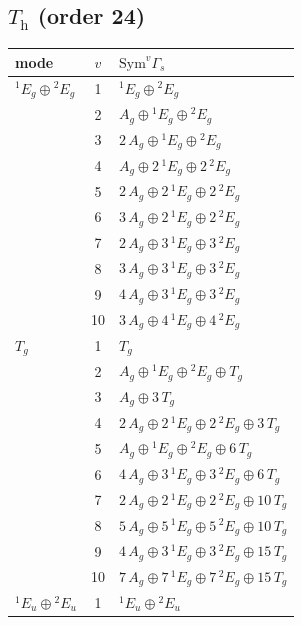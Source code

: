 \documentclass[11pt]{article}
\begin{document}
\subsection*{$T_{\mathrm h}$ \quad (order 24)}
\begin{longtable}{l c p{}}
\hline mode & $v$ & $\mathrm{Sym}^v\Gamma_s$\\ \hline\endhead
${}^{1}E_{g}\oplus {}^{2}E_{g}$ & 1 & ${}^{1}E_{g}\oplus {}^{2}E_{g}$\\
 & 2 & $A_{g}\oplus {}^{1}E_{g}\oplus {}^{2}E_{g}$\\
 & 3 & $2\,A_{g}\oplus {}^{1}E_{g}\oplus {}^{2}E_{g}$\\
 & 4 & $A_{g}\oplus 2\,{}^{1}E_{g}\oplus 2\,{}^{2}E_{g}$\\
 & 5 & $2\,A_{g}\oplus 2\,{}^{1}E_{g}\oplus 2\,{}^{2}E_{g}$\\
 & 6 & $3\,A_{g}\oplus 2\,{}^{1}E_{g}\oplus 2\,{}^{2}E_{g}$\\
 & 7 & $2\,A_{g}\oplus 3\,{}^{1}E_{g}\oplus 3\,{}^{2}E_{g}$\\
 & 8 & $3\,A_{g}\oplus 3\,{}^{1}E_{g}\oplus 3\,{}^{2}E_{g}$\\
 & 9 & $4\,A_{g}\oplus 3\,{}^{1}E_{g}\oplus 3\,{}^{2}E_{g}$\\
 & 10 & $3\,A_{g}\oplus 4\,{}^{1}E_{g}\oplus 4\,{}^{2}E_{g}$\\
\hline
$T_{g}$ & 1 & $T_{g}$\\
 & 2 & $A_{g}\oplus {}^{1}E_{g}\oplus {}^{2}E_{g}\oplus T_{g}$\\
 & 3 & $A_{g}\oplus 3\,T_{g}$\\
 & 4 & $2\,A_{g}\oplus 2\,{}^{1}E_{g}\oplus 2\,{}^{2}E_{g}\oplus 3\,T_{g}$\\
 & 5 & $A_{g}\oplus {}^{1}E_{g}\oplus {}^{2}E_{g}\oplus 6\,T_{g}$\\
 & 6 & $4\,A_{g}\oplus 3\,{}^{1}E_{g}\oplus 3\,{}^{2}E_{g}\oplus 6\,T_{g}$\\
 & 7 & $2\,A_{g}\oplus 2\,{}^{1}E_{g}\oplus 2\,{}^{2}E_{g}\oplus 10\,T_{g}$\\
 & 8 & $5\,A_{g}\oplus 5\,{}^{1}E_{g}\oplus 5\,{}^{2}E_{g}\oplus 10\,T_{g}$\\
 & 9 & $4\,A_{g}\oplus 3\,{}^{1}E_{g}\oplus 3\,{}^{2}E_{g}\oplus 15\,T_{g}$\\
 & 10 & $7\,A_{g}\oplus 7\,{}^{1}E_{g}\oplus 7\,{}^{2}E_{g}\oplus 15\,T_{g}$\\
\hline
${}^{1}E_{u}\oplus {}^{2}E_{u}$ & 1 & ${}^{1}E_{u}\oplus {}^{2}E_{u}$\\

\end{longtable}
\end{document}
